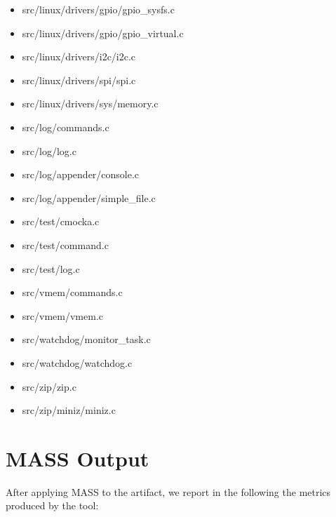 \begin{itemize}
	\item src/linux/drivers/gpio/gpio\_sysfs.c
	\item src/linux/drivers/gpio/gpio\_virtual.c
	\item src/linux/drivers/i2c/i2c.c
	\item src/linux/drivers/spi/spi.c
	\item src/linux/drivers/sys/memory.c
	\item src/log/commands.c
	\item src/log/log.c
	\item src/log/appender/console.c
	\item src/log/appender/simple\_file.c
	\item src/test/cmocka.c
	\item src/test/command.c
	\item src/test/log.c
	\item src/vmem/commands.c
	\item src/vmem/vmem.c
	\item src/watchdog/monitor\_task.c
	\item src/watchdog/watchdog.c
	\item src/zip/zip.c
	\item src/zip/miniz/miniz.c
\end{itemize}


\section{MASS Output}

After applying MASS to the artifact, we report in the following the metrics produced by the tool:

